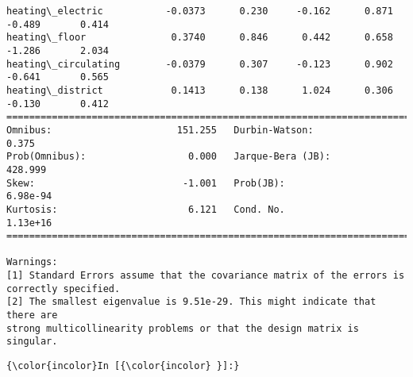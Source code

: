 \documentclass[11pt]{article}
\begin{document}
\begin{Verbatim}[commandchars=\\\{\}]
heating\_electric           -0.0373      0.230     -0.162      0.871      -0.489       0.414
heating\_floor               0.3740      0.846      0.442      0.658      -1.286       2.034
heating\_circulating        -0.0379      0.307     -0.123      0.902      -0.641       0.565
heating\_district            0.1413      0.138      1.024      0.306      -0.130       0.412
==============================================================================
Omnibus:                      151.255   Durbin-Watson:                   0.375
Prob(Omnibus):                  0.000   Jarque-Bera (JB):              428.999
Skew:                          -1.001   Prob(JB):                     6.98e-94
Kurtosis:                       6.121   Cond. No.                     1.13e+16
==============================================================================

Warnings:
[1] Standard Errors assume that the covariance matrix of the errors is correctly specified.
[2] The smallest eigenvalue is 9.51e-29. This might indicate that there are
strong multicollinearity problems or that the design matrix is singular.

    \end{Verbatim}

    \begin{Verbatim}[commandchars=\\\{\}]
{\color{incolor}In [{\color{incolor} }]:} 
\end{Verbatim}


    
    
    
    
\end{document}
